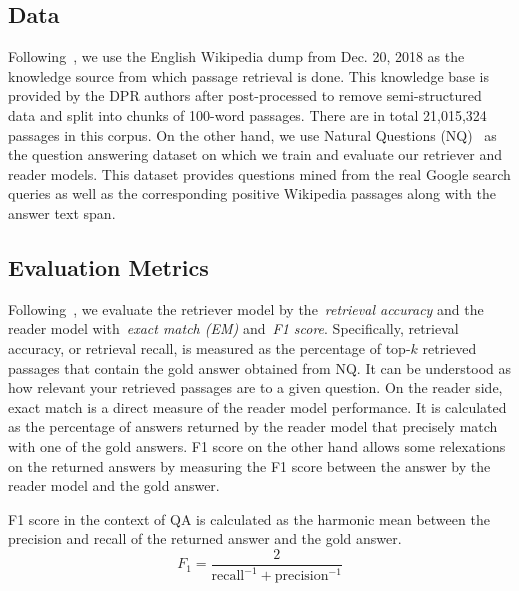 \subsection{Data}\label{sec:exp_data}
%
Following~\cite{karpukhin2020dense}, we use the English Wikipedia dump from Dec. 20, 2018 as the knowledge source from which passage retrieval is done.
%
This knowledge base is provided by the DPR authors after post-processed to remove semi-structured data and split into chunks of 100-word passages.
%
There are in total 21,015,324 passages in this corpus.
%
On the other hand, we use Natural Questions (NQ)~\cite{kwiatkowski2019natural} as the question answering dataset on which we train and evaluate our retriever and reader models.
%
This dataset provides questions mined from the real Google search queries as well as the corresponding positive Wikipedia passages along with the answer text span.

\subsection{Evaluation Metrics}
%
Following~\cite{karpukhin2020dense}, we evaluate the retriever model by the~\emph{retrieval accuracy} and the reader model with~\emph{exact match (EM)} and~\emph{F1 score}.
%
Specifically, retrieval accuracy, or retrieval recall, is measured as the percentage of top-$k$ retrieved passages that contain the gold answer obtained from NQ.
%
It can be understood as how relevant your retrieved passages are to a given question.
%
On the reader side, exact match is a direct measure of the reader model performance.
%
It is calculated as the percentage of answers returned by the reader model that precisely match with one of the gold answers.
%
F1 score on the other hand allows some relexations on the returned answers by measuring the F1 score between the answer by the reader model and the gold answer.
%
\begin{definition}[F1 score]
	F1 score in the context of QA is calculated as the harmonic mean between the precision and recall of the returned answer and the gold answer.
	\begin{equation}
	\label{eq:f1_score}
	F_1 = \frac{2}{\text{recall}^{-1} + \text{precision}^{-1}}
	\end{equation}
\end{definition}